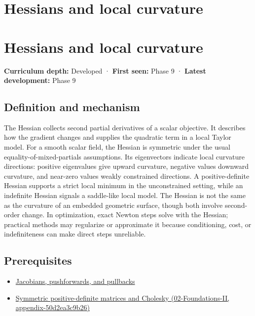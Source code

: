 \hypertarget{appendix-6ac071f8b50c}{}
\section*{Hessians and local curvature}
\section{Hessians and local curvature}\label{appendix-6ac071f8b50c-hessians-and-local-curvature}

\textbf{Curriculum depth:} Developed · \textbf{First seen:} Phase 9 · \textbf{Latest development:} Phase 9

\subsection{Definition and mechanism}\label{appendix-6ac071f8b50c-definition-and-mechanism}

The Hessian collects second partial derivatives of a scalar objective. It describes how the gradient changes and supplies the quadratic term in a local Taylor model. For a smooth scalar field, the Hessian is symmetric under the usual equality-of-mixed-partials assumptions. Its eigenvectors indicate local curvature directions: positive eigenvalues give upward curvature, negative values downward curvature, and near-zero values weakly constrained directions. A positive-definite Hessian supports a strict local minimum in the unconstrained setting, while an indefinite Hessian signals a saddle-like local model. The Hessian is not the same as the curvature of an embedded geometric surface, though both involve second-order change. In optimization, exact Newton steps solve with the Hessian; practical methods may regularize or approximate it because conditioning, cost, or indefiniteness can make direct steps unreliable.

\subsection{Prerequisites}\label{appendix-6ac071f8b50c-prerequisites}

\begin{itemize}
\tightlist
\item
  \hyperref[appendix-d8a7ddb675eb]{Jacobians, pushforwards, and pullbacks}
\item
  \href{../02-Foundations-II/main.pdf\#nameddest=appendix-50d2ea3c9b26}{Symmetric positive-definite matrices and Cholesky (02-Foundations-II, appendix-50d2ea3c9b26)}
\end{itemize}

